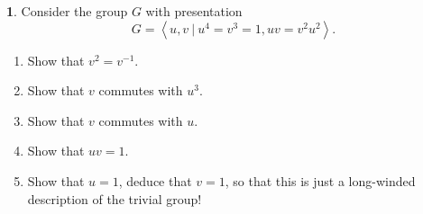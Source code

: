 \documentclass[12pt]{article}
\theoremstyle{definition}
\newtheorem{ex}{}
\begin{document}
\begin{ex}
	Consider the group $G$ with presentation \begin{equation*}
		G = \left\langle u, v \ |\ u^4 = v^3 = 1, uv = v^2u^2 \right\rangle.
	\end{equation*}
	\begin{enumerate}[label=(\alph*)]
		\item Show that $v^2 = v^{-1}$.
		\item Show that $v$ commutes with $u^3$.
		\item Show that $v$ commutes with $u$.
		\item Show that $uv = 1$.
		\item Show that $u = 1$, deduce that $v = 1$, so that this is just a long-winded description of the trivial group!
	\end{enumerate}
\end{ex}
\end{document}
